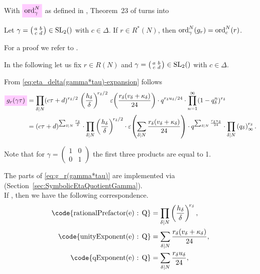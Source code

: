 \documentclass{article}
\begin{document}
With $\defineNotation[ord-gamma-N]{\ord_\gamma^N}$ as defined in
\cite{Radu_RamanujanKolberg_2015}, Theorem~23 of
\cite{Radu_RamanujanKolberg_2015} turns into
\begin{Theorem}\label{thm:order}
  Let $\gamma =
  \bigl(
  \begin{smallmatrix}
    a & b\\
    c & d
  \end{smallmatrix}
  \bigr)
  \in \SL2Z$ with $c\in\Delta$.
  If $r \in R^*(N)$, then
  $\operatorname{ord}_\gamma^N(g_r) = \operatorname{ord}_c^N(r)$.
\end{Theorem}
For a proof we refer to
\cite[Proposition~3.2.8]{Ligozat_CourbesModulaires_1975}.

In the following let us fix $r \in R(N)$ and
$\gamma =
  \bigl(
  \begin{smallmatrix}
    a & b\\
    c & d
  \end{smallmatrix}
  \bigr)
  \in \SL2Z$ with $c \in \Delta$.

From \eqref{eq:eta_delta(gamma*tau)-expansion} follows
\begin{align}
  \defineNotation[g-r-gamma-tau]{g_r(\gamma \tau)}
  &=
  \divisorprod{N}
  (c \tau+d)^{r_\delta/2}
  \,
  \left(\frac{h_\delta}{\delta}\right)^{\!r_\delta/2}
  \,
  \unityPower{\frac{r_\delta(v_\delta + \kappa_\delta)}{24}}
  \cdot
  q^{r_\delta u_\delta/24}
  \cdot
    \prod_{n=1}^{\infty}(1-q_\delta^n)^{r_\delta}
  \notag
  \\
  &=
  (c \tau+d)^{\divisorsum{N} \frac{r_\delta}{2}}
  \cdot
  \divisorprod{N}
  \left(\frac{h_\delta}{\delta}\right)^{\!r_\delta/2}
  \cdot
  \unityPower{\divisorsum{N} \frac{r_\delta(v_\delta + \kappa_\delta)}{24}}
  \cdot
  q^{\divisorsum{N} \frac{r_\delta u_\delta}{24}}
  \cdot
  \divisorprod{N} \eulerFunction[q_\delta]{}^{r_\delta}.
  \label{eq:g_r(gamma*tau)}
\end{align}

Note that for
$\gamma=\left(\begin{smallmatrix}1&0\\0&1\end{smallmatrix}\right)$ the
first three products are equal to 1.


The parts of \eqref{eq:g_r(gamma*tau)} are implemented via
\textcolor{blue}{}
(Section~\ref{sec:SymbolicEtaQuotientGamma}).
\\
If , then we have the following
correspondence.
\begin{align*}
  \text{\code{rationalPrefactor(e) : Q}}
  &=
    \divisorprod{N} \left(\frac{h_\delta}{\delta}\right)^{\!r_\delta},
  \\
  \text{\code{unityExponent(e) : Q}}
  &=
    \divisorsum{N} \frac{r_\delta(v_\delta + \kappa_\delta)}{24},
  \\
  \text{\code{qExponent(e) : Q}}
  &=
    \divisorsum{N} \frac{r_\delta u_\delta}{24},
\end{align*}
\end{document}
